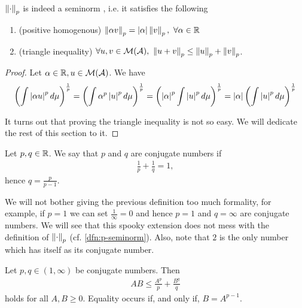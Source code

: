 \begin{lem}
	\label{lem:seminorm}
	$\left\Vert{\cdot}\right\Vert_p$ is indeed a seminorm \cite{wiki-norm}, i.e. it satisfies the following
	\begin{enumerate}
		\item (positive homogenous) $\left\Vert{\alpha v}\right\Vert_p = \left\vert{\alpha}\right\vert\left\Vert{v}\right\Vert_p,\ \forall \alpha \in \mathbb{R}$
		\item (triangle inequality) $\forall u, v \in \mathcal{M}(\mathcal{A}),\ \left\Vert{u + v}\right\Vert_p \leq \left\Vert{u}\right\Vert_p + \left\Vert{v}\right\Vert_p$.
	\end{enumerate}
\end{lem}

\begin{proof}
	\item Let $\alpha \in \mathbb{R}, u \in \mathcal{M}(\mathcal{A})$. We have
	\begin{align*}
		\left(\int \left\vert{\alpha u}\right\vert^p d \mu\right)^{\frac{1}{p}}
		= \left(\int \alpha^p \left\vert{u}\right\vert^p d \mu\right)^{\frac{1}{p}}
		= \left(\left\vert{\alpha}\right\vert^p \int \left\vert{u}\right\vert^p d \mu\right)^{\frac{1}{p}}
		= \left\vert{\alpha}\right\vert \left(\int \left\vert{u}\right\vert^p d \mu\right)^{\frac{1}{p}}
	\end{align*}
	\item It turns out that proving the triangle inequality is not so easy. We will dedicate the rest of this section to it.
\end{proof}

\begin{dfn}
	Let $p, q \in \mathbb{R}$. We say that $p$ and $q$ are conjugate numbers if
	\begin{align}
		\frac{1}{p} + \frac{1}{q} = 1,
	\end{align}
	hence $q = \frac{p}{p - 1}$.
\end{dfn}

We will not bother giving the previous definition too much formality, for example, if $p = 1$ we can set $\frac{1}{\infty} = 0$ and hence $p = 1$ and $q = \infty$ are conjugate numbers. We will see that this spooky extension does not mess with the definition of $\left\Vert{\cdot}\right\Vert_p$ (cf. \autoref{dfn:p-seminorm}). Also, note that $2$ is the only number which has itself as its conjugate number.

\begin{lem}
	\label{lem:young}
	Let $p, q \in (1, \infty)$ be conjugate numbers. Then
	\begin{align}
		AB \leq \frac{A^p}{p} + \frac{B^q}{q}
	\end{align}
	holds for all $A, B \geq 0$. Equality occurs if, and only if, $B = A^{p - 1}$.
\end{lem}

